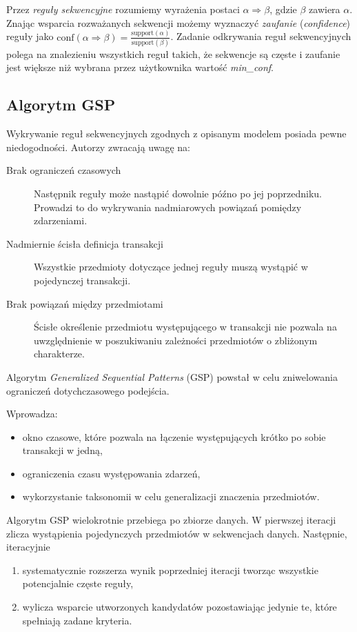 \documentclass[paper=a4, fontsize=11pt]{scrartcl} %
\numberwithin{equation}{section} %
\numberwithin{figure}{section} %
\numberwithin{table}{section} %
\begin{document}
Przez {\em reguły sekwencyjne} rozumiemy wyrażenia postaci \( \alpha
\Rightarrow \beta \), gdzie \(\beta \) zawiera \( \alpha \).  Znając wsparcia
rozważanych sekwencji możemy wyznaczyć {\em zaufanie} ({\em confidence})
reguły jako \( \text{conf}(\alpha \Rightarrow \beta) = \frac{\text{support}(\alpha)}{\text{support}(\beta)}\).
Zadanie odkrywania reguł sekwencyjnych polega na znalezieniu wszystkich reguł
takich, że sekwencje są częste i zaufanie jest większe niż wybrana przez
użytkownika wartość {\em min\_conf}.

\subsection{Algorytm GSP}
Wykrywanie reguł sekwencyjnych zgodnych z opisanym modelem posiada pewne niedogodności. Autorzy \cite{gsp}
zwracają uwagę na:
\begin{description}
    \item[Brak ograniczeń czasowych] Następnik reguły może nastąpić dowolnie późno po jej poprzedniku. Prowadzi to do wykrywania nadmiarowych powiązań pomiędzy zdarzeniami.
    \item[Nadmiernie ścisła definicja transakcji] Wszystkie przedmioty dotyczące jednej reguły muszą wystąpić w pojedynczej transakcji.
    \item[Brak powiązań między przedmiotami] Ścisłe określenie przedmiotu występującego w transakcji nie pozwala na uwzględnienie w poszukiwaniu zależności przedmiotów o zbliżonym charakterze.
\end{description}

Algorytm \emph{Generalized Sequential Patterns} (GSP) powstał w celu zniwelowania ograniczeń dotychczasowego podejścia.

Wprowadza:
\begin{itemize}
    \item okno czasowe, które pozwala na łączenie występujących krótko po sobie transakcji w jedną,
    \item ograniczenia czasu występowania zdarzeń,
    \item wykorzystanie taksonomii w celu generalizacji znaczenia przedmiotów.
\end{itemize}

Algorytm GSP wielokrotnie przebiega po zbiorze danych. W pierwszej iteracji zlicza wystąpienia pojedynczych przedmiotów w sekwencjach danych. Następnie, iteracyjnie
\begin{enumerate}
    \item systematycznie rozszerza wynik poprzedniej iteracji tworząc wszystkie potencjalnie częste reguły,
    \item wylicza wsparcie utworzonych kandydatów pozostawiając jedynie te, które spełniają zadane kryteria.
\end{enumerate}
\end{document}
